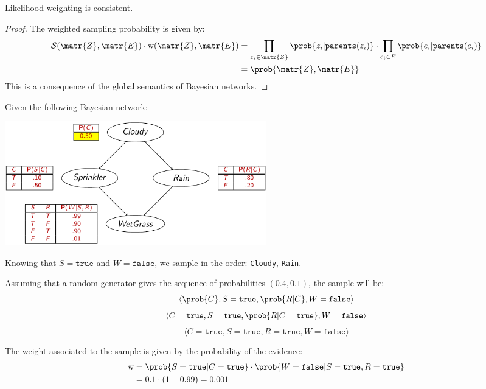 \begin{theorem}
    Likelihood weighting is consistent.

    \begin{proof}
        The weighted sampling probability is given by:
        \[ 
            \begin{split}
                \mathcal{S}(\matr{Z}, \matr{E}) \cdot \text{w}(\matr{Z}, \matr{E})
                &= \prod_{z_i \in \matr{Z}} \prob{z_i | \texttt{parents}(z_i)} \cdot \prod_{e_i \in E} \prob{e_i | \texttt{parents}(e_i)} \\
                &= \prob{\matr{Z}, \matr{E}}
            \end{split}
        \]
        This is a consequence of the global semantics of Bayesian networks.
    \end{proof}
\end{theorem}

\begin{example}
    Given the following Bayesian network:
    \begin{center}
        \includegraphics[width=0.5\textwidth]{img/_approx_infer_example.pdf}
    \end{center}

    Knowing that $S=\texttt{true}$ and $W=\texttt{false}$,
    we sample in the order: \texttt{Cloudy}, \texttt{Rain}.
    
    Assuming that a random generator gives the sequence of probabilities $(0.4, 0.1)$,
    the sample will be:
    \[ \langle \prob{C}, S=\texttt{true}, \prob{R | C}, W=\texttt{false} \rangle \]
    \[ \langle C=\texttt{true}, S=\texttt{true}, \prob{R | C=\texttt{true}}, W=\texttt{false} \rangle \]
    \[ \langle C=\texttt{true}, S=\texttt{true}, R=\texttt{true}, W=\texttt{false} \rangle \]

    The weight associated to the sample is given by the probability of the evidence:
    \[ 
        \begin{split}
            \text{w} &= \prob{S=\texttt{true} | C=\texttt{true}} \cdot \prob{W=\texttt{false} | S=\texttt{true}, R=\texttt{true}} \\
            &= 0.1 \cdot (1 - 0.99) = 0.001
        \end{split}
    \]
\end{example}



